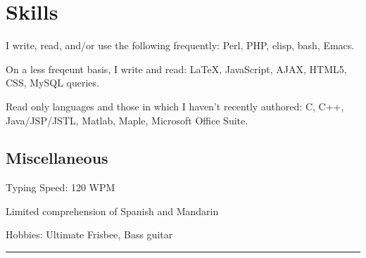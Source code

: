 \documentclass[10pt]{article}
\begin{document}
\section{Skills}
\vspace{-0.25cm}
\item I write, read, and/or use the following frequently: Perl, PHP, elisp, bash, Emacs.
\item On a less freqeunt basis, I write and read: \LaTeX, JavaScript, AJAX, HTML5, CSS, MySQL queries.
\item Read only languages and those in which I haven't recently authored: C, C++, Java/JSP/JSTL, Matlab, Maple, Microsoft Office Suite.
\subsection{Miscellaneous}
\item Typing Speed: 120 WPM
\item Limited comprehension of Spanish and Mandarin
\item Hobbies: Ultimate Frisbee, Bass guitar
%
\vfill
\hrule
\end{document}
